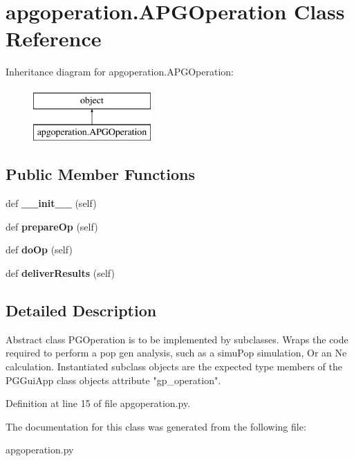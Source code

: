 \hypertarget{classapgoperation_1_1APGOperation}{}\section{apgoperation.\+A\+P\+G\+Operation Class Reference}
\label{classapgoperation_1_1APGOperation}
Inheritance diagram for apgoperation.\+A\+P\+G\+Operation\+:\begin{figure}[H]
\begin{center}
\leavevmode
\includegraphics[height=2.000000cm]{classapgoperation_1_1APGOperation}
\end{center}
\end{figure}
\subsection*{Public Member Functions}
\begin{DoxyCompactItemize}
\item 
def {\bfseries \+\_\+\+\_\+init\+\_\+\+\_\+} (self)\hypertarget{classapgoperation_1_1APGOperation_ac04a426061e4d073c8577393fa0063a1}{}\label{classapgoperation_1_1APGOperation_ac04a426061e4d073c8577393fa0063a1}

\item 
def {\bfseries prepare\+Op} (self)\hypertarget{classapgoperation_1_1APGOperation_acbb2a2934ec6ffb4e9dcd1a99c529ac0}{}\label{classapgoperation_1_1APGOperation_acbb2a2934ec6ffb4e9dcd1a99c529ac0}

\item 
def {\bfseries do\+Op} (self)\hypertarget{classapgoperation_1_1APGOperation_acada7062e3b2a5eb74833617ceb343e7}{}\label{classapgoperation_1_1APGOperation_acada7062e3b2a5eb74833617ceb343e7}

\item 
def {\bfseries deliver\+Results} (self)\hypertarget{classapgoperation_1_1APGOperation_a112e0b5cee7ec7cf6c8146ff05f222b3}{}\label{classapgoperation_1_1APGOperation_a112e0b5cee7ec7cf6c8146ff05f222b3}

\end{DoxyCompactItemize}


\subsection{Detailed Description}
\begin{DoxyVerb}Abstract class PGOperation is to be implemented by subclasses.
Wraps the code required to perform a pop gen analysis, such as a simuPop simulation,
Or an Ne calculation.  Instantiated subclass objects are the expected type members 
of the PGGuiApp class objects attribute "gp_operation".
\end{DoxyVerb}
 

Definition at line 15 of file apgoperation.\+py.



The documentation for this class was generated from the following file\+:\begin{DoxyCompactItemize}
\item 
apgoperation.\+py\end{DoxyCompactItemize}
